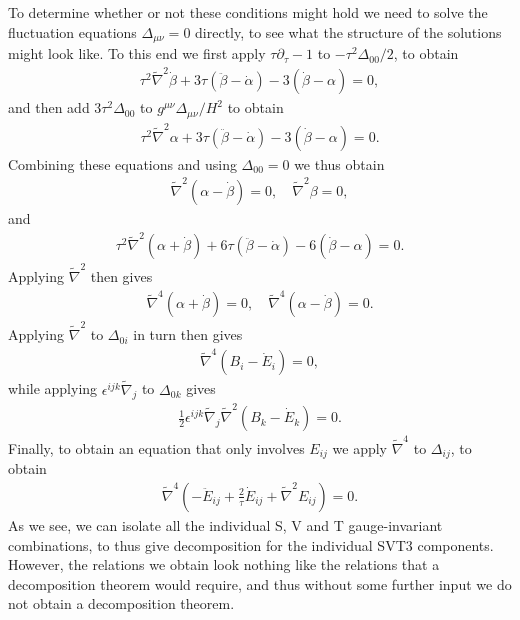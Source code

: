 \documentclass[aps,onecolumn,10pt]{revtex4}
\numberwithin{equation}{section}
\numberwithin{equation}{section}
\begin{document}
To determine whether or not these conditions might hold we need to solve the fluctuation equations $\Delta_{\mu\nu}=0$ directly, to see what the structure of the solutions might look like.  To this end we first apply $\tau\partial_{\tau}-1$ to $-\tau^2\Delta_{00}/2$,  to obtain
%
\begin{eqnarray}
\tau^2\tilde{\nabla}^2\dot{\beta}+3\tau(\ddot{\beta}-\dot{\alpha})-3(\dot{\beta}-\alpha)=0,
\label{7.9}
\end{eqnarray}
%
and then add $3\tau^2\Delta_{00}$ to  $g^{\mu\nu}\Delta_{\mu\nu}/H^2$ to obtain
%
\begin{eqnarray}
\tau^2\tilde{\nabla}^2\alpha+3\tau(\ddot{\beta}-\dot{\alpha})-3(\dot{\beta}-\alpha)=0.
\label{7.10}
\end{eqnarray}
%
Combining these equations and using $\Delta_{00}=0$ we thus obtain
%
\begin{eqnarray}
\tilde{\nabla}^2(\alpha-\dot{\beta})=0,\quad \tilde{\nabla}^2\beta=0,
\label{7.11}
\end{eqnarray}
%
and 
%
\begin{eqnarray}
\tau^2\tilde{\nabla}^2(\alpha+\dot{\beta})+6\tau(\ddot{\beta}-\dot{\alpha})-6(\dot{\beta}-\alpha)=0.
\label{7.12}
\end{eqnarray}
%
Applying $\tilde{\nabla}^2$ then gives
%
\begin{eqnarray}
\tilde{\nabla}^4(\alpha+\dot{\beta})=0,\quad \tilde{\nabla}^4(\alpha-\dot{\beta})=0.
\label{7.13}
\end{eqnarray}
%
Applying $\tilde{\nabla}^2$ to $\Delta_{0i}$ in turn then gives
%
\begin{eqnarray}
 \tilde{\nabla}^4(B_i-\dot{E}_i)=0,
\label{7.14}
\end{eqnarray}
%
while applying $\epsilon^{ijk}\tilde{\nabla}_j$ to $\Delta_{0k}$ gives
%
\begin{eqnarray}
\frac{1}{2}\epsilon^{ijk}\tilde{\nabla}_j\tilde{\nabla}^2(B_k-\dot{E}_k)=0.
\label{7.15}
\end{eqnarray}
%
Finally, to obtain an equation that only involves $E_{ij}$ we apply $\tilde{\nabla}^4$ to $\Delta_{ij}$, to obtain
%
\begin{eqnarray}
 \tilde{\nabla}^4\left(-\ddot{E}_{ij}+\frac{2}{\tau}\dot{E}_{ij}+\tilde{\nabla}^2E_{ij}\right)=0.
\label{7.16}
\end{eqnarray}
%
As we see, we can isolate all the individual S, V and T gauge-invariant combinations, to thus give decomposition for the individual SVT3 components. However, the relations we obtain look nothing like the relations that a decomposition theorem would require, and thus without some further input we do not obtain a decomposition theorem.
\end{document}
